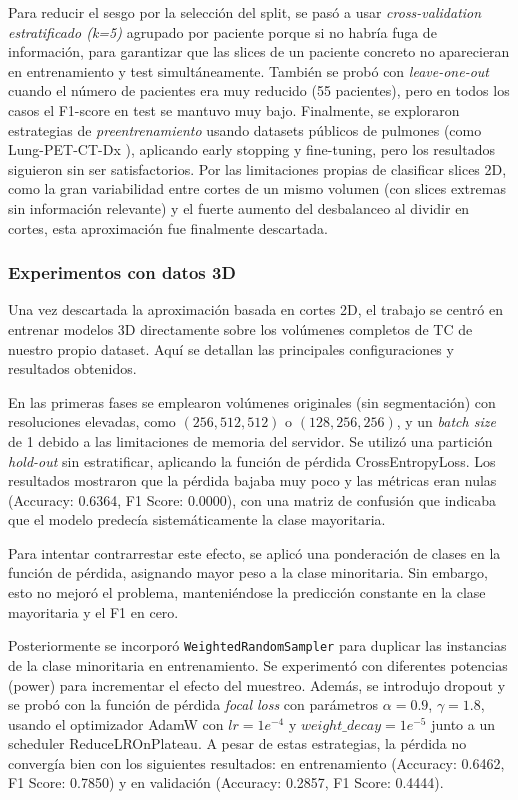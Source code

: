 Para reducir el sesgo por la selección del split, se pasó a usar \textit{cross-validation estratificado (k=5)} agrupado por paciente porque si no habría fuga de información, para garantizar que las slices de un paciente concreto no aparecieran en entrenamiento y test simultáneamente. También se probó con \textit{leave-one-out} cuando el número de pacientes era muy reducido (55 pacientes), pero en todos los casos el F1-score en test se mantuvo muy bajo. Finalmente, se exploraron estrategias de \textit{preentrenamiento} usando datasets públicos de pulmones (como Lung-PET-CT-Dx \parencite{lungPetCtDx}), aplicando early stopping y fine-tuning, pero los resultados siguieron sin ser satisfactorios. Por las limitaciones propias de clasificar slices 2D, como la gran variabilidad entre cortes de un mismo volumen (con slices extremas sin información relevante) y el fuerte aumento del desbalanceo al dividir en cortes, esta aproximación fue finalmente descartada.



\subsubsection{Experimentos con datos 3D}

Una vez descartada la aproximación basada en cortes 2D, el trabajo se centró en entrenar modelos 3D directamente sobre los volúmenes completos de TC de nuestro propio dataset. Aquí se detallan las principales configuraciones y resultados obtenidos.

En las primeras fases se emplearon volúmenes originales (sin segmentación) con resoluciones elevadas, como $(256, 512, 512)$ o  $(128,256,256)$, y un \textit{batch size} de 1 debido a las limitaciones de memoria del servidor. Se utilizó una partición \textit{hold-out} sin estratificar, aplicando la función de pérdida CrossEntropyLoss. Los resultados mostraron que la pérdida bajaba muy poco y las métricas eran nulas (Accuracy: 0.6364, F1 Score: 0.0000), con una matriz de confusión que indicaba que el modelo predecía sistemáticamente la clase mayoritaria.

Para intentar contrarrestar este efecto, se aplicó una ponderación de clases en la función de pérdida, asignando mayor peso a la clase minoritaria. Sin embargo, esto no mejoró el problema, manteniéndose la predicción constante en la clase mayoritaria y el F1 en cero.

Posteriormente se incorporó \texttt{WeightedRandomSampler} para duplicar las instancias de la clase minoritaria en entrenamiento. Se experimentó con diferentes potencias (power) para incrementar el efecto del muestreo. Además, se introdujo dropout y se probó con la función de pérdida \textit{focal loss} con parámetros $\alpha=0.9$, $\gamma=1.8$, usando el optimizador AdamW con $lr=1e^{-4}$ y $weight\_decay=1e^{-5}$ junto a un scheduler ReduceLROnPlateau. A pesar de estas estrategias, la pérdida no convergía bien con los siguientes resultados: en entrenamiento (Accuracy: 0.6462, F1 Score: 0.7850) y en validación (Accuracy: 0.2857, F1 Score: 0.4444).

